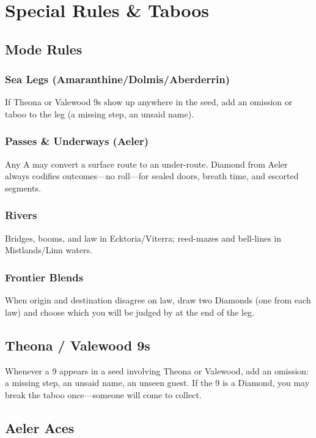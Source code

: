 \documentclass[12pt,oneside]{book}
\begin{document}
\section{Special Rules \& Taboos}

\subsection{Mode Rules}

\subsubsection{Sea Legs (Amaranthine/Dolmis/Aberderrin)}
If Theona or Valewood 9s show up anywhere in the seed, add an omission or taboo to the leg (a missing step, an unsaid name).

\subsubsection{Passes \& Underways (Aeler)}
Any A may convert a surface route to an under-route. Diamond from Aeler always codifies outcomes---no roll---for sealed doors, breath time, and escorted segments.

\subsubsection{Rivers}
Bridges, booms, and law in Ecktoria/Viterra; reed-mazes and bell-lines in Mistlands/Linn waters.

\subsubsection{Frontier Blends}
When origin and destination disagree on law, draw two Diamonds (one from each law) and choose which you will be judged by at the end of the leg.

\subsection{Theona / Valewood 9s}

Whenever a 9 appears in a seed involving Theona or Valewood, add an omission: a missing step, an unsaid name, an unseen guest. If the 9 is a Diamond, you may break the taboo once---someone will come to collect.

\subsection{Aeler Aces}
\end{document}
